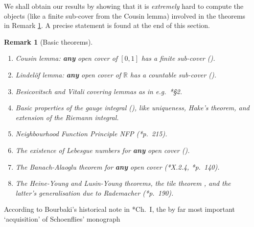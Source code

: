 \documentclass[reqno]{amsart}
\newtheorem{rem}[thm]{Remark}
\def\R{{\mathbb  R}}
\numberwithin{equation}{section}
\numberwithin{thm}{section}
\begin{document}
\smallskip

We shall obtain our results by showing that it is \emph{extremely} hard to compute the objects (like a finite sub-cover from the Cousin lemma) involved in the theorems in Remark \ref{bthm}.
A precise statement is found at the end of this section.    
\begin{rem}[Basic theorems]\label{bthm}\rm~
\begin{enumerate}
\renewcommand{\theenumi}{\roman{enumi}}
\item \emph{Cousin lemma}: \textbf{any} open cover of $[0,1]$ has a finite sub-cover (\cite{cousin1}).    
\item \emph{Lindel\"of lemma}: \textbf{any} open cover of $\R$ has a countable sub-cover (\cite{blindeloef}).
\item \emph{Besicovitsch and Vitali covering lemmas} as in e.g.\ \cite{auke}*{\S2}.
\item Basic properties of the gauge integral (\cite{bartle}), like uniqueness, Hake's theorem, and extension of the Riemann integral.\label{dorfjes}  %
\item \emph{Neighbourhood Function Principle} \textsf{NFP} (\cite{troeleke1}*{p.\ 215}).  \label{NFP}
\item The existence of \emph{Lebesgue numbers} for \textbf{any} open cover (\cite{moregusto}). 
\item The \emph{Banach-Alaoglu theorem} for \textbf{any} open cover (\cite{simpson2}*{X.2.4}, \cite{xbrownphd}*{p.\ 140}).
\item The \emph{Heine-Young} and \emph{Lusin-Young} theorems, the \emph{tile theorem} \cite{YY, wildehilde}, 
and the latter's generalisation due to Rademacher (\cite{rademachen}*{p.\ 190}).
\end{enumerate}
\end{rem}
According to Bourbaki's historical note in \cite{gentop1}*{Ch.\ I}, the by far most important `acquisition' of Schoenflies' monograph \cite{schoeniswaar} 
\end{document}
